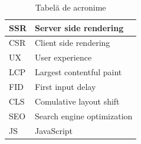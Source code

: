 \documentclass[12pt, a4paper]{report}
\begin{document}
\begin{table} [H]
	\begin{tabular} {|  l | L{10cm} |}
		\hline
		SSR & Server side rendering      \\ [0.2ex]
		\hline
		CSR & Client side rendering      \\ [0.2ex]
		\hline
		UX  & User experience            \\ [0.2ex]
		\hline
		LCP & Largest contentful paint   \\  [0.2ex]
		\hline
		FID & First input delay          \\ [0.2ex]
		\hline
		CLS & Comulative layout shift    \\ [0.2ex]
		\hline
		SEO & Search engine optimization \\ [0.2ex]
		\hline
		JS  & JavaScript                 \\ [0.2ex]
		\hline
	\end{tabular}
	\caption{Tabelă de acronime}
	\label{table:acron}
\end{table}

\end{document}

